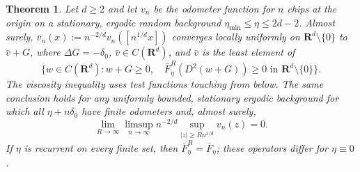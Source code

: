 \documentclass[12pt]{amsart}
\newcommand{\R}{\mathbf{R}}
\newtheorem{theorem}{Theorem}[section]
\begin{document}
\begin{theorem} %
Let $d\geq2$ and let $v_n$ be the odometer function for $n$ chips at the origin on a stationary, ergodic random background $\eta_{\min}\leq\eta\leq2d-2$. Almost surely, $\bar v_n(x):=n^{-2/d}v_n([n^{1/d}x])$ converges locally uniformly on $\R^d\setminus\{0\}$ to $\bar v+G$, where $\Delta G=-\delta_0$, $\bar v\in C(\R^d)$, and $\bar v$ is the least element of %
\[\{w\in C(\R^d):w+G\geq0,\quad \bar F^R_\eta(D^2(w+G))\geq0\text{ in }\R^d\setminus\{0\}\}.\] %
The viscosity inequality uses test functions touching from below. The same conclusion holds for any uniformly bounded, stationary ergodic background for which all $\eta+n\delta_0$ have finite odometers and, almost surely, %
\[\lim_{R\to\infty}\limsup_{n\to\infty}n^{-2/d}\sup_{|z|\geq Rn^{1/d}}v_n(z)=0.\tag{VT}\] %
If $\eta$ is recurrent on every finite set, then $\bar F^R_\eta=\bar F_\eta$; these operators differ for $\eta\equiv0$. %
\end{theorem} %
\end{document}
